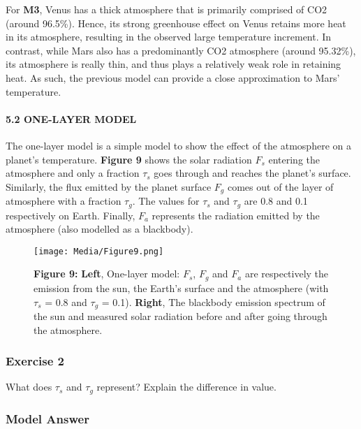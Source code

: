 \documentclass[
  letterpaper,
  DIV=11,
  numbers=noendperiod]{scrartcl}
\let\oldparagraph\paragraph
\renewcommand{\paragraph}[1]{\oldparagraph{#1}\mbox{}}
\begin{document}
For \textbf{M3}, Venus has a thick atmosphere that is primarily
comprised of CO2 (around 96.5\%). Hence, its strong greenhouse effect on
Venus retains more heat in its atmosphere, resulting in the observed
large temperature increment. In contrast, while Mars also has a
predominantly CO2 atmosphere (around 95.32\%), its atmosphere is really
thin, and thus plays a relatively weak role in retaining heat. As such,
the previous model can provide a close approximation to Mars'
temperature.

\hypertarget{one-layer-model-1}{%
\paragraph{5.2 ONE-LAYER MODEL}\label{one-layer-model-1}}

The one-layer model is a simple model to show the effect of the
atmosphere on a planet's temperature. \textbf{Figure 9} shows the solar
radiation \(F_s\) entering the atmosphere and only a fraction \(\tau_s\)
goes through and reaches the planet's surface. Similarly, the flux
emitted by the planet surface \(F_g\) comes out of the layer of
atmosphere with a fraction \(\tau_g\). The values for \(\tau_s\) and
\(\tau_g\) are 0.8 and 0.1 respectively on Earth. Finally, \(F_a\)
represents the radiation emitted by the atmosphere (also modelled as a
blackbody).

\begin{figure}

{\centering \texttt{[image: Media/Figure9.png]}

}

\caption{\textbf{Figure 9:} \textbf{Left}, One-layer model: \(F_s\),
\(F_g\) and \(F_a\) are respectively the emission from the sun, the
Earth's surface and the atmosphere (with \(\tau_s\) = 0.8 and \(\tau_g\)
= 0.1). \textbf{Right}, The blackbody emission spectrum of the sun and
measured solar radiation before and after going through the atmosphere.}

\end{figure}

\subsubsection{\texorpdfstring{\textbf{Exercise 2}}{Exercise 2}}

What does \(\tau_s\) and \(\tau_g\) represent? Explain the difference in
value.

\subsubsection{\texorpdfstring{\textbf{Model Answer}}{Model Answer}}
\end{document}
